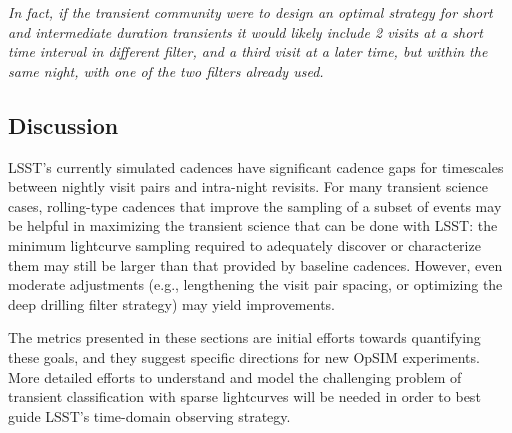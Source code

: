 \emph{In fact, if the transient community were to design an optimal strategy for short and intermediate duration transients it would likely include 2 visits at a short time interval in different filter, and a third visit at a later time, but within the same night, with one of the two filters already used.}




\subsection{Discussion}
\label{sec:\chpname:discussion}

LSST's currently simulated cadences have significant cadence gaps for
timescales between nightly visit pairs and intra-night revisits.  For
many transient science cases, rolling-type cadences that improve the
sampling of a subset of events may be helpful in maximizing the
transient science that can be done with LSST: the minimum lightcurve
sampling required to adequately discover or characterize them may
still be larger than that provided by baseline cadences.  However,
even moderate adjustments (e.g., lengthening the visit pair spacing,
or optimizing the deep drilling filter strategy) may yield
improvements.


The metrics presented in these sections are initial efforts towards
quantifying these goals, and they suggest specific directions for new
OpSIM experiments.  More detailed efforts to understand and model the
challenging problem of transient classification with sparse
lightcurves will be needed in order to best guide LSST's time-domain
observing strategy.

\navigationbar












